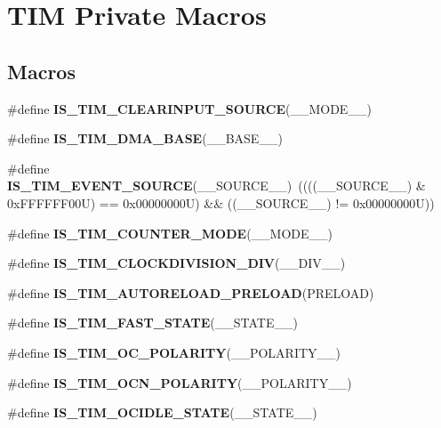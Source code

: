 \hypertarget{group___t_i_m___private___macros}{}\section{T\+IM Private Macros}
\label{group___t_i_m___private___macros}
\subsection*{Macros}
\begin{DoxyCompactItemize}
\item 
\#define {\bfseries I\+S\+\_\+\+T\+I\+M\+\_\+\+C\+L\+E\+A\+R\+I\+N\+P\+U\+T\+\_\+\+S\+O\+U\+R\+CE}(\+\_\+\+\_\+\+M\+O\+D\+E\+\_\+\+\_\+)
\item 
\#define {\bfseries I\+S\+\_\+\+T\+I\+M\+\_\+\+D\+M\+A\+\_\+\+B\+A\+SE}(\+\_\+\+\_\+\+B\+A\+S\+E\+\_\+\+\_\+)
\item 
\mbox{\label{group___t_i_m___private___macros_gae4a44eb3977f1cba86a9179c8c7f6b36}} 
\#define {\bfseries I\+S\+\_\+\+T\+I\+M\+\_\+\+E\+V\+E\+N\+T\+\_\+\+S\+O\+U\+R\+CE}(\+\_\+\+\_\+\+S\+O\+U\+R\+C\+E\+\_\+\+\_\+)~((((\+\_\+\+\_\+\+S\+O\+U\+R\+C\+E\+\_\+\+\_\+) \& 0x\+F\+F\+F\+F\+F\+F00\+U) == 0x00000000\+U) \&\& ((\+\_\+\+\_\+\+S\+O\+U\+R\+C\+E\+\_\+\+\_\+) != 0x00000000\+U))
\item 
\#define {\bfseries I\+S\+\_\+\+T\+I\+M\+\_\+\+C\+O\+U\+N\+T\+E\+R\+\_\+\+M\+O\+DE}(\+\_\+\+\_\+\+M\+O\+D\+E\+\_\+\+\_\+)
\item 
\#define {\bfseries I\+S\+\_\+\+T\+I\+M\+\_\+\+C\+L\+O\+C\+K\+D\+I\+V\+I\+S\+I\+O\+N\+\_\+\+D\+IV}(\+\_\+\+\_\+\+D\+I\+V\+\_\+\+\_\+)
\item 
\#define {\bfseries I\+S\+\_\+\+T\+I\+M\+\_\+\+A\+U\+T\+O\+R\+E\+L\+O\+A\+D\+\_\+\+P\+R\+E\+L\+O\+AD}(P\+R\+E\+L\+O\+AD)
\item 
\#define {\bfseries I\+S\+\_\+\+T\+I\+M\+\_\+\+F\+A\+S\+T\+\_\+\+S\+T\+A\+TE}(\+\_\+\+\_\+\+S\+T\+A\+T\+E\+\_\+\+\_\+)
\item 
\#define {\bfseries I\+S\+\_\+\+T\+I\+M\+\_\+\+O\+C\+\_\+\+P\+O\+L\+A\+R\+I\+TY}(\+\_\+\+\_\+\+P\+O\+L\+A\+R\+I\+T\+Y\+\_\+\+\_\+)
\item 
\#define {\bfseries I\+S\+\_\+\+T\+I\+M\+\_\+\+O\+C\+N\+\_\+\+P\+O\+L\+A\+R\+I\+TY}(\+\_\+\+\_\+\+P\+O\+L\+A\+R\+I\+T\+Y\+\_\+\+\_\+)
\item 
\#define {\bfseries I\+S\+\_\+\+T\+I\+M\+\_\+\+O\+C\+I\+D\+L\+E\+\_\+\+S\+T\+A\+TE}(\+\_\+\+\_\+\+S\+T\+A\+T\+E\+\_\+\+\_\+)

\end{DoxyCompactItemize}
